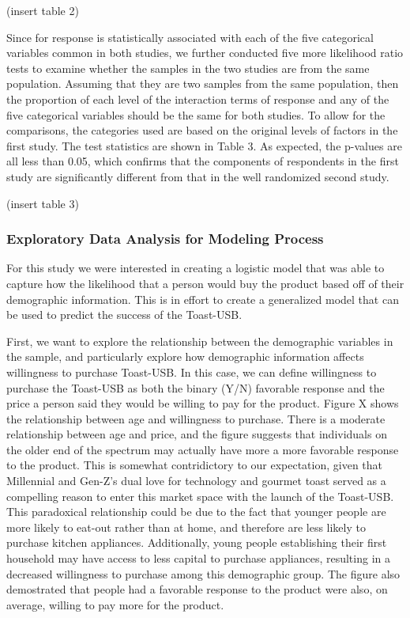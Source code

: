 \documentclass[]{article}
\begin{document}
(insert table 2)

Since for response is statistically associated with each of the five
categorical variables common in both studies, we further conducted five
more likelihood ratio tests to examine whether the samples in the two
studies are from the same population. Assuming that they are two samples
from the same population, then the proportion of each level of the
interaction terms of response and any of the five categorical variables
should be the same for both studies. To allow for the comparisons, the
categories used are based on the original levels of factors in the first
study. The test statistics are shown in Table 3. As expected, the
p-values are all less than 0.05, which confirms that the components of
respondents in the first study are significantly different from that in
the well randomized second study.

(insert table 3)

\hypertarget{exploratory-data-analysis-for-modeling-process}{%
\subsubsection{Exploratory Data Analysis for Modeling
Process}\label{exploratory-data-analysis-for-modeling-process}}

For this study we were interested in creating a logistic model that was
able to capture how the likelihood that a person would buy the product
based off of their demographic information. This is in effort to create
a generalized model that can be used to predict the success of the
Toast-USB.

First, we want to explore the relationship between the demographic
variables in the sample, and particularly explore how demographic
information affects willingness to purchase Toast-USB. In this case, we
can define willingness to purchase the Toast-USB as both the binary
(Y/N) favorable response and the price a person said they would be
willing to pay for the product. Figure X shows the relationship between
age and willingness to purchase. There is a moderate relationship
between age and price, and the figure suggests that individuals on the
older end of the spectrum may actually have more a more favorable
response to the product. This is somewhat contridictory to our
expectation, given that Millennial and Gen-Z's dual love for technology
and gourmet toast served as a compelling reason to enter this market
space with the launch of the Toast-USB. This paradoxical relationship
could be due to the fact that younger people are more likely to eat-out
rather than at home, and therefore are less likely to purchase kitchen
appliances. Additionally, young people establishing their first
household may have access to less capital to purchase appliances,
resulting in a decreased willingness to purchase among this demographic
group. The figure also demostrated that people had a favorable response
to the product were also, on average, willing to pay more for the
product.
\end{document}
